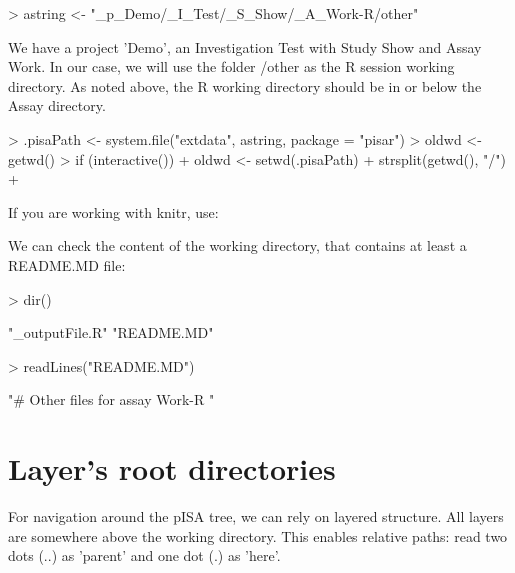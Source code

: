 \documentclass[a4paper,12pt]{article}\usepackage[]{graphicx}\usepackage[]{color}
\makeatletter
\providecommand\code{\bgroup\@codex}
\def\@codex#1{{\normalfont\ttfamily\hyphenchar\font=-1  #1}\egroup}
\providecommand{\file}{\code}
\makeatother
\begin{document}
\begin{Schunk}
\begin{Sinput}
> astring <- "_p_Demo/_I_Test/_S_Show/_A_Work-R/other"
\end{Sinput}
\end{Schunk}

We have a project \code{'Demo'}, an Investigation \code{Test} with Study \code{Show}  and Assay \code{Work}. In our case, we will use the folder \file{/other} as the R session working directory. As noted above, the R working directory should be in or below the Assay directory.

\begin{Schunk}
\begin{Sinput}
> .pisaPath <- system.file("extdata", astring, package = "pisar")
> oldwd <- getwd()
> if (interactive()) {
+     oldwd <- setwd(.pisaPath)
+     strsplit(getwd(), "/")
+ }
\end{Sinput}
\end{Schunk}

If you are working with knitr, use:
\begin{Schunk}
\end{Schunk}

We can check the content of the working directory, that contains at least a \file{README.MD} file:
\begin{Schunk}
\begin{Sinput}
> dir()
\end{Sinput}
\begin{Soutput}
[1] "_outputFile.R" "README.MD"    
\end{Soutput}
\begin{Sinput}
> readLines("README.MD")
\end{Sinput}
\begin{Soutput}
[1] "# Other files for assay Work-R "
\end{Soutput}
\end{Schunk}

\section{Layer's root directories}

For navigation around the pISA tree, we can rely on layered structure. All layers are somewhere above the working directory. This enables relative paths: read two dots (..) as 'parent' and one dot (.) as 'here'.
\end{document}
